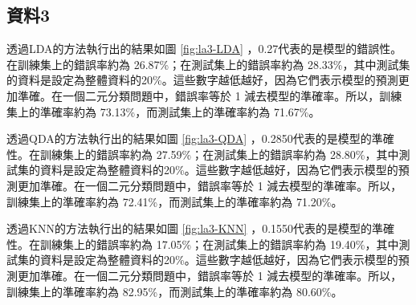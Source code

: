 \subsection{資料3}
透過LDA的方法執行出的結果如圖 \ref{fig:la3-LDA} ，0.27代表的是模型的錯誤性。在訓練集上的錯誤率約為 26.87\%；在測試集上的錯誤率約為 28.33\%，其中測試集的資料是設定為整體資料的20\%。這些數字越低越好，因為它們表示模型的預測更加準確。在一個二元分類問題中，錯誤率等於 1 減去模型的準確率。所以，訓練集上的準確率約為 73.13\%，而測試集上的準確率約為 71.67\%。

透過QDA的方法執行出的結果如圖 \ref{fig:la3-QDA} ，0.2850代表的是模型的準確性。在訓練集上的錯誤率約為 27.59\%；在測試集上的錯誤率約為 28.80\%，其中測試集的資料是設定為整體資料的20\%。這些數字越低越好，因為它們表示模型的預測更加準確。在一個二元分類問題中，錯誤率等於 1 減去模型的準確率。所以，訓練集上的準確率約為 72.41\%，而測試集上的準確率約為 71.20\%。

透過KNN的方法執行出的結果如圖 \ref{fig:la3-KNN} ，0.1550代表的是模型的準確性。在訓練集上的錯誤率約為 17.05\%；在測試集上的錯誤率約為 19.40\%，其中測試集的資料是設定為整體資料的20\%。這些數字越低越好，因為它們表示模型的預測更加準確。在一個二元分類問題中，錯誤率等於 1 減去模型的準確率。所以，訓練集上的準確率約為 82.95\%，而測試集上的準確率約為 80.60\%。

